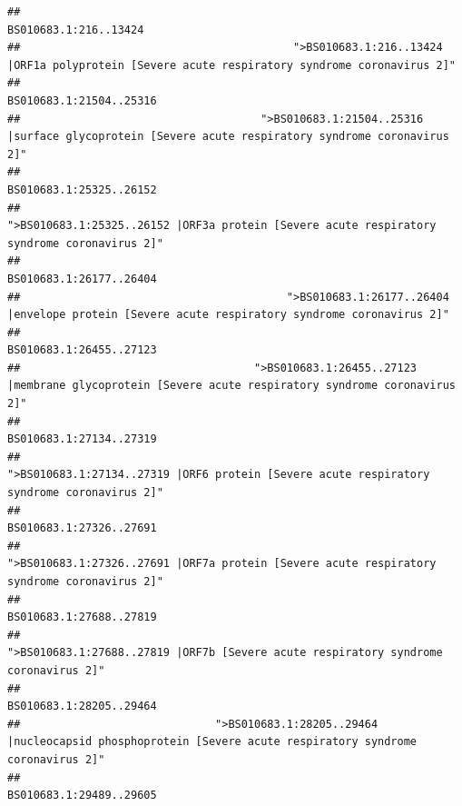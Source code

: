 \documentclass[
]{article}
\begin{document}
\begin{verbatim}
##                                                                                                                  BS010683.1:216..13424 
##                                          ">BS010683.1:216..13424 |ORF1a polyprotein [Severe acute respiratory syndrome coronavirus 2]" 
##                                                                                                                BS010683.1:21504..25316 
##                                     ">BS010683.1:21504..25316 |surface glycoprotein [Severe acute respiratory syndrome coronavirus 2]" 
##                                                                                                                BS010683.1:25325..26152 
##                                            ">BS010683.1:25325..26152 |ORF3a protein [Severe acute respiratory syndrome coronavirus 2]" 
##                                                                                                                BS010683.1:26177..26404 
##                                         ">BS010683.1:26177..26404 |envelope protein [Severe acute respiratory syndrome coronavirus 2]" 
##                                                                                                                BS010683.1:26455..27123 
##                                    ">BS010683.1:26455..27123 |membrane glycoprotein [Severe acute respiratory syndrome coronavirus 2]" 
##                                                                                                                BS010683.1:27134..27319 
##                                             ">BS010683.1:27134..27319 |ORF6 protein [Severe acute respiratory syndrome coronavirus 2]" 
##                                                                                                                BS010683.1:27326..27691 
##                                            ">BS010683.1:27326..27691 |ORF7a protein [Severe acute respiratory syndrome coronavirus 2]" 
##                                                                                                                BS010683.1:27688..27819 
##                                                    ">BS010683.1:27688..27819 |ORF7b [Severe acute respiratory syndrome coronavirus 2]" 
##                                                                                                                BS010683.1:28205..29464 
##                              ">BS010683.1:28205..29464 |nucleocapsid phosphoprotein [Severe acute respiratory syndrome coronavirus 2]" 
##                                                                                                                BS010683.1:29489..29605 

\end{verbatim}
\end{document}

